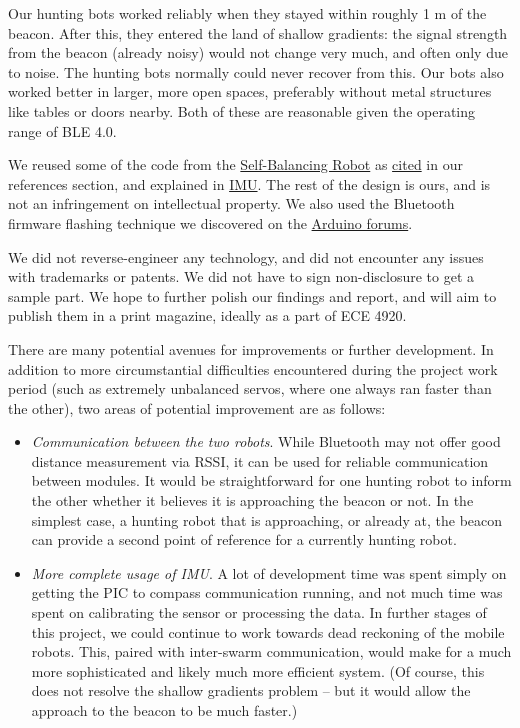 \documentclass[]{article}
\providecommand{\tightlist}{%
  \setlength{\itemsep}{0pt}\setlength{\parskip}{0pt}}
\begin{document}
Our hunting bots worked reliably when they stayed within roughly 1 m of
the beacon. After this, they entered the land of shallow gradients: the
signal strength from the beacon (already noisy) would not change very
much, and often only due to noise. The hunting bots normally could never
recover from this. Our bots also worked better in larger, more open
spaces, preferably without metal structures like tables or doors nearby.
Both of these are reasonable given the operating range of BLE 4.0.

We reused some of the code from the
\href{https://people.ece.cornell.edu/land/courses/ece4760/FinalProjects/f2015/dc686_nn233_hz263/final_project_webpage_v2/dc686_nn233_hz263/index.html}{Self-Balancing
Robot} as
\protect\hyperlink{code-and-designs-borrowed-from-others}{cited} in our
references section, and explained in \protect\hyperlink{imu}{IMU}. The
rest of the design is ours, and is not an infringement on intellectual
property. We also used the Bluetooth firmware flashing technique we
discovered on the
\href{http://forum.arduino.cc/index.php?topic=393655.msg2709528\#msg2709528}{Arduino
forums}.

We did not reverse-engineer any technology, and did not encounter any
issues with trademarks or patents. We did not have to sign
non-disclosure to get a sample part. We hope to further polish our
findings and report, and will aim to publish them in a print magazine,
ideally as a part of ECE 4920.

There are many potential avenues for improvements or further
development. In addition to more circumstantial difficulties encountered
during the project work period (such as extremely unbalanced servos,
where one always ran faster than the other), two areas of potential
improvement are as follows:

\begin{itemize}
\tightlist
\item
  \emph{Communication between the two robots}. While Bluetooth may not
  offer good distance measurement via RSSI, it can be used for reliable
  communication between modules. It would be straightforward for one
  hunting robot to inform the other whether it believes it is
  approaching the beacon or not. In the simplest case, a hunting robot
  that is approaching, or already at, the beacon can provide a second
  point of reference for a currently hunting robot.
\item
  \emph{More complete usage of IMU}. A lot of development time was spent
  simply on getting the PIC to compass communication running, and not
  much time was spent on calibrating the sensor or processing the data.
  In further stages of this project, we could continue to work towards
  dead reckoning of the mobile robots. This, paired with inter-swarm
  communication, would make for a much more sophisticated and likely
  much more efficient system. (Of course, this does not resolve the
  shallow gradients problem -- but it would allow the approach to the
  beacon to be much faster.)
\end{itemize}
\end{document}
